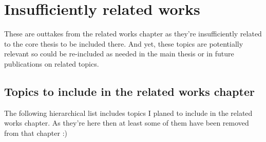 \chapter{Insufficiently related works}
These are outtakes from the related works chapter as they're insufficiently related to the core thesis to be included there. And yet, these topics are potentially relevant so could be re-included as needed in the main thesis or in future publications on related topics.


\section{Topics to include in the related works chapter}
The following hierarchical list includes topics I planed to include in the related works chapter. As they're here then at least some of them have been removed from that chapter :)


